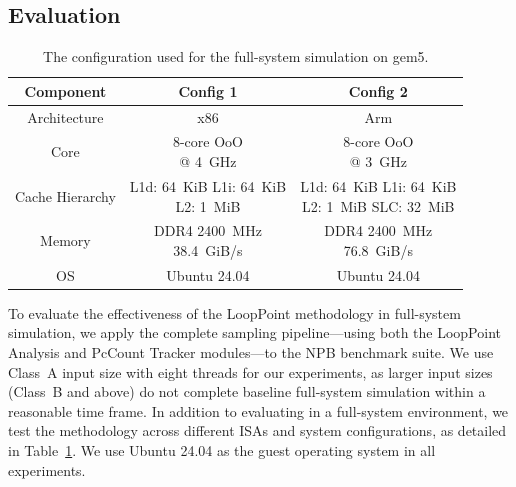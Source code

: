 \subsection{Evaluation}\label{sec:looppoint_evaluation}

\begin{table}[!t]
  \centering
  \scriptsize
  \setlength{\tabcolsep}{3pt}
  \renewcommand{\arraystretch}{1.2}

  \begin{tabular}{|c|c|c|}
    \hline
    \textbf{Component}
      & \textbf{Config 1}
      & \textbf{Config 2} \\ \hline
    Architecture
      & x86
      & Arm \\ \hline
    Core
      & \makecell[l]{8-core OoO\\@ 4~GHz}
      & \makecell[l]{8-core OoO\\@ 3~GHz} \\ \hline
    Cache Hierarchy
      & \makecell[l]{L1d: 64~KiB L1i: 64~KiB\\L2: 1~MiB}
      & \makecell[l]{L1d: 64~KiB L1i: 64~KiB\\L2: 1~MiB SLC: 32~MiB} \\ \hline
    Memory
      & \makecell[l]{DDR4 2400~MHz\\38.4~GiB/s}
      & \makecell[l]{DDR4 2400~MHz\\76.8~GiB/s} \\ \hline
    OS
      & Ubuntu 24.04
      & Ubuntu 24.04 \\ \hline
  \end{tabular}

  \caption{The configuration used for the full-system simulation on gem5.}
  \label{tab:gem5-config}
\end{table}
\FloatBarrier

To evaluate the effectiveness of the LoopPoint methodology in full-system simulation, we apply the complete sampling pipeline---using both the LoopPoint Analysis and PcCount Tracker modules---to the NPB benchmark suite.
We use Class~A input size with eight threads for our experiments, as larger input sizes (Class~B and above) do not complete baseline full-system simulation within a reasonable time frame.
In addition to evaluating in a full-system environment, we test the methodology across different ISAs and system configurations, as detailed in Table~\ref{tab:gem5-config}.
We use Ubuntu 24.04 as the guest operating system in all experiments.

